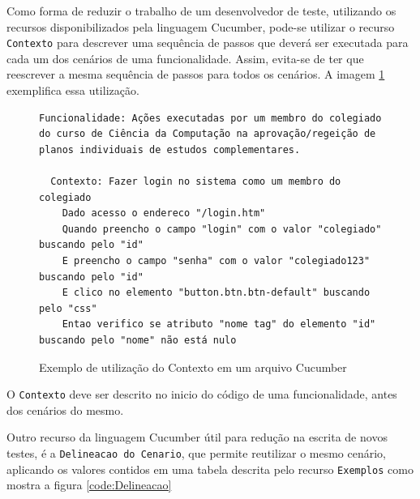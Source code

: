 \documentclass[tg]{mdtufsm}
\begin{document}
Como forma de reduzir o trabalho de um desenvolvedor de teste, utilizando os recursos disponibilizados pela linguagem Cucumber, pode-se utilizar o recurso \texttt{Contexto} para descrever uma sequência de passos que deverá ser executada para cada um dos cenários de uma funcionalidade. Assim, evita-se de ter que reescrever a mesma sequência de passos para todos os cenários. A imagem \ref{code:Contexto} exemplifica essa utilização.

\begin{figure}[!htt]
	\begin{lstlisting}
Funcionalidade: Ações executadas por um membro do colegiado do curso de Ciência da Computação na aprovação/regeição de planos individuais de estudos complementares.

  Contexto: Fazer login no sistema como um membro do colegiado
    Dado acesso o endereco "/login.htm"
    Quando preencho o campo "login" com o valor "colegiado" buscando pelo "id"
    E preencho o campo "senha" com o valor "colegiado123" buscando pelo "id"
    E clico no elemento "button.btn.btn-default" buscando pelo "css"
    Entao verifico se atributo "nome tag" do elemento "id" buscando pelo "nome" não está nulo
	\end{lstlisting}
	\caption{Exemplo de utilização do Contexto em um arquivo Cucumber}
	\label{code:Contexto}
\end{figure}

O \texttt{Contexto} deve ser descrito no inicio do código de uma funcionalidade, antes dos cenários do mesmo.

Outro recurso da linguagem Cucumber útil para redução na escrita de novos testes, é a \texttt{Delineacao do Cenario}, que permite reutilizar o mesmo cenário, aplicando os
valores contidos em uma tabela descrita pelo recurso \texttt{Exemplos} como mostra a figura \ref{code:Delineacao}
\end{document}
